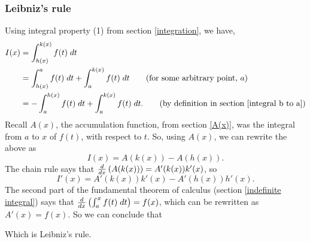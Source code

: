 \subsubsection{Leibniz's rule} \label{leibniz's rule}
Using integral property (1) from section \ref{integration}, we have,
\begin{align*}
I(x)    & = \int_{h(x)}^{k(x)} f(t) \; dt \\
	& = \int_{h(x)}^a f(t) \; dt + \int_a^{k(x)} f(t) \; dt \tag{for some arbitrary point, $a$} \\
	& = -\int_a^{h(x)} f(t) \; dt + \int_a^{k(x)} f(t) \; dt. \tag{by definition in section \ref{integral b to a}}
\end{align*}
Recall $A(x)$, the accumulation function, from section \ref{A(x)}, was the integral from $a$ to $x$ of $f(t)$, with respect to $t$. So, using $A(x)$, we can rewrite the above as
\[
I(x) = A(k(x)) - A(h(x)).
\]
The chain rule says that $\frac{d}{dx}\left(A(k(x))\right) = A'(k(x))k'(x)$, so
\[
I'(x) = A'(k(x))k'(x) - A'(h(x))h'(x).
\]
The second part of the fundamental theorem of calculus (section \ref{indefinite integral}) says that $\frac{d}{dx}\left(\int_a^x f(t) \; dt\right) = f(x)$, which can be rewritten as $A'(x) = f(x)$. So we can conclude that

  	\bigskip
	
	\hfil{}
	\bigskip

\noindent Which is Leibniz's rule.

